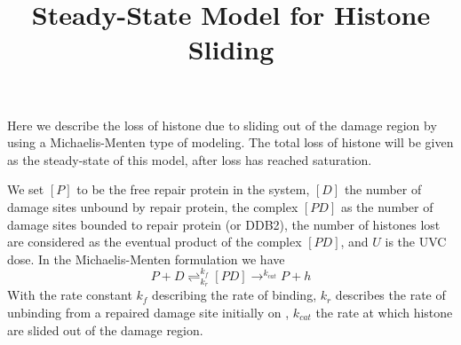 \documentclass[12pt]{report}
\begin{document}
	
\title{Steady-State Model for Histone Sliding}
\maketitle


Here we describe the loss of histone due to sliding out of the damage region by using a Michaelis-Menten type of modeling.
The total loss of histone will be given as the steady-state of this model, after loss has reached saturation. 

We set $[P]$ to be the free repair protein in the system, $[D]$ the number of damage sites unbound by repair protein, the complex $[PD]$ as the number of damage sites bounded to repair protein (or DDB2), the number of histones lost are considered as the eventual product of the complex $[PD]$, and $U$ is the UVC dose. In the Michaelis-Menten formulation we have 
\begin{equation}
P+D\rightleftharpoons_{k_r}^{k_f}[PD]\rightarrow^{k_{cat}}P+h
\end{equation}
With the rate constant $k_f$ describing the rate of binding, $k_r$ describes the rate of unbinding  from a repaired damage site initially on , $k_{cat}$ the rate at which histone are slided out of the damage region. 
\end{document}
